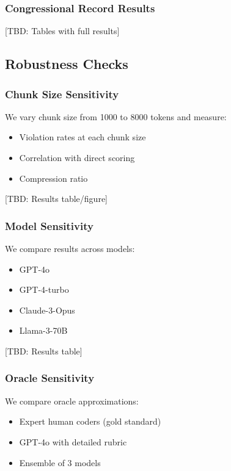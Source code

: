 \subsubsection{Congressional Record Results}

[TBD: Tables with full results]

\subsection{Robustness Checks}

\subsubsection{Chunk Size Sensitivity}

We vary chunk size from 1000 to 8000 tokens and measure:
\begin{itemize}[nosep]
    \item Violation rates at each chunk size
    \item Correlation with direct scoring
    \item Compression ratio
\end{itemize}

[TBD: Results table/figure]

\subsubsection{Model Sensitivity}

We compare results across models:
\begin{itemize}[nosep]
    \item GPT-4o
    \item GPT-4-turbo
    \item Claude-3-Opus
    \item Llama-3-70B
\end{itemize}

[TBD: Results table]

\subsubsection{Oracle Sensitivity}

We compare oracle approximations:
\begin{itemize}[nosep]
    \item Expert human coders (gold standard)
    \item GPT-4o with detailed rubric
    \item Ensemble of 3 models
\end{itemize}

